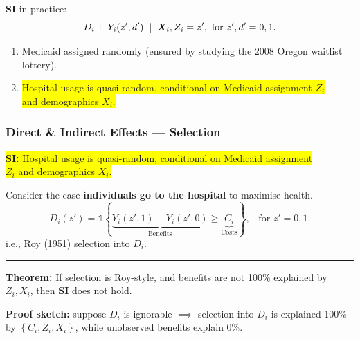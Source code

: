 \documentclass[dvipsnames]{beamer} %
\renewcommand{\vec}[1]{\boldsymbol{\mathit{#1}}}                           %
\newcommand{\indicator}[1]{\mathds{1}\left\{ #1 \right\}}                  %
\newcommand{\indep}{\, \raisebox{0.05em}{\rotatebox[origin=c]{90}{$\models$}} \,}%
\begin{document}
\begin{frame}[noframenumbering]
    \textbf{SI} in practice:
    \[ D_i \indep Y_i(z', d') \;\; | \;\; \vec X_i, Z_i = z',
    \text{ for } z', d' = 0, 1. \]
    \begin{enumerate}
        \item Medicaid assigned randomly (ensured by studying the 2008 Oregon waitlist lottery).
        \item \colorbox{yellow}{Hospital usage is quasi-random, conditional on Medicaid assignment $Z_i$} \\
        \colorbox{yellow}{and demographics $\vec X_i$.}
    \end{enumerate}
\end{frame}
\begin{frame}[noframenumbering]
    \frametitle{Direct \& Indirect Effects --- Selection} 
    \colorbox{yellow}{\textbf{SI:}
        Hospital usage is quasi-random, conditional on Medicaid assignment} \\
    \colorbox{yellow}{$Z_i$ and demographics $\vec X_i$.}

    \vskip0.25cm
    Consider the case \textbf{individuals go to the hospital} to maximise health.
    \[ D_i \left( z' \right) = \indicator{
        \underbrace{Y_i\left( z', 1 \right) - Y_i\left( z', 0 \right)}_{\text{Benefits}}
        \geq \underbrace{C_i}_{\text{Costs}}}, \;\;\; \text{for } z'=0,1.
    \]
    i.e., Roy (1951) selection into $D_i$.
    \par\noindent\rule{\textwidth}{0.4pt}
    \pause
    \vfill
    \textbf{Theorem:}
    If selection is Roy-style, and benefits are not 100\% explained by $Z_i, \vec X_i$, then \textbf{SI} does not hold.

    \vskip0.125cm
    \textbf{Proof sketch:} suppose $D_i$ is ignorable $\implies$ selection-into-$D_i$ is explained 100\% by $\left\{ C_i, Z_i, \vec X_i \right\}$, while unobserved benefits explain 0\%.
\end{frame}
\end{document}
